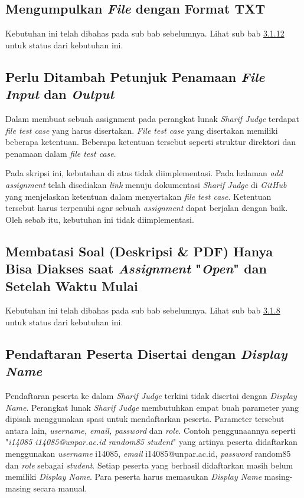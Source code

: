 \subsection{Mengumpulkan \textit{File} dengan Format TXT}
Kebutuhan ini telah dibahas pada sub bab sebelumnya. Lihat sub bab \hyperref[subsec:filetxt]{3.1.12} untuk status dari kebutuhan ini.

\subsection{Perlu Ditambah Petunjuk Penamaan \textit{File} \textit{Input} dan \textit{Output}}
Dalam membuat sebuah assignment pada perangkat lunak \textit{Sharif Judge} terdapat \textit{file test case} yang harus disertakan. \textit{File test case} yang disertakan memiliki beberapa ketentuan. Beberapa ketentuan tersebut seperti struktur direktori dan penamaan dalam \textit{file test case}. 

Pada skripsi ini, kebutuhan di atas tidak diimplementasi. Pada halaman \textit{add assignment} telah disediakan \textit{link} menuju dokumentasi \textit{Sharif Judge} di \textit{GitHub} yang menjelaskan ketentuan dalam menyertakan \textit{file test case}. Ketentuan tersebut harus terpenuhi agar sebuah \textit{assignment} dapat berjalan dengan baik. Oleh sebab itu, kebutuhan ini tidak diimplementasi.

\subsection{Membatasi Soal (Deskripsi \& PDF) Hanya Bisa Diakses saat \textit{Assignment} "\textit{Open}" dan Setelah Waktu Mulai}
Kebutuhan ini telah dibahas pada sub bab sebelumnya. Lihat sub bab \hyperref[subsec:membatasisoal]{3.1.8} untuk status dari kebutuhan ini.

\subsection{Pendaftaran Peserta Disertai dengan \textit{Display Name}}
Pendaftaran peserta ke dalam \textit{Sharif Judge} terkini tidak disertai dengan \textit{Display Name}. Perangkat lunak \textit{Sharif Judge} membutuhkan empat buah parameter yang dipisah menggunakan spasi untuk mendaftarkan peserta. Parameter tersebut antara lain, \textit{username, \textit{email}, password} dan \textit{role}. Contoh penggunaannya seperti "\textit{i14085 i14085@unpar.ac.id random85 student}" yang artinya peserta didaftarkan menggunakan \textit{username} i14085, \textit{email} i14085@unpar.ac.id, \textit{password} random85 dan \textit{role} sebagai \textit{student}. Setiap peserta yang berhasil didaftarkan masih belum memiliki \textit{Display Name}. Para peserta harus memasukan \textit{Display Name} masing-masing secara manual. 

